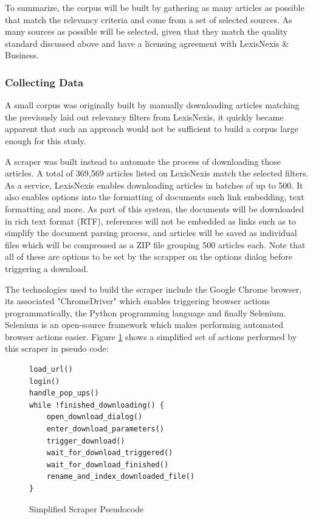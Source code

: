 To summarize, the corpus will be built by gathering as many articles as possible that match the relevancy criteria and come from a set of selected sources. As many sources as possible will be selected, given that they match the quality standard discussed above and have a licensing agreement with LexisNexis \& Business.

\subsubsection{Collecting Data}\label{Collecting Data}

A small corpus was originally built by manually downloading articles matching the previously laid out relevancy filters from LexisNexis, it quickly became apparent that such an approach would not be sufficient to build a corpus large enough for this study.

A scraper was built instead to automate the process of downloading those articles. A total of 369,569 articles listed on LexisNexis match the selected filters. As a service, LexisNexis enables downloading articles in batches of up to 500. It also enables options into the formatting of documents such link embedding, text formatting and more. As part of this system, the documents will be downloaded in rich text format (RTF), references will not be embedded as links such as to simplify the document parsing process, and articles will be saved as individual files which will be compressed as a ZIP file grouping 500 articles each. Note that all of these are options to be set by the scrapper on the options dialog before triggering a download.

The technologies used to build the scraper include the Google Chrome browser, its associated "ChromeDriver" which enables triggering browser actions programmatically, the Python programming language and finally Selenium. Selenium is an open-source framework which makes performing automated browser actions easier. Figure \ref{fig:scraper pseudo code} shows a simplified set of actions performed by this scraper in pseudo code:

\begin{figure}[h!]
\centering
\begin{BVerbatim}
load_url()
login()
handle_pop_ups()
while !finished_downloading() {
    open_download_dialog()
    enter_download_parameters()
    trigger_download()
    wait_for_download_triggered()
    wait_for_download_finished()
    rename_and_index_downloaded_file()
}
\end{BVerbatim}
\caption{Simplified Scraper Pseudocode}
\label{fig:scraper pseudo code}
\end{figure}

